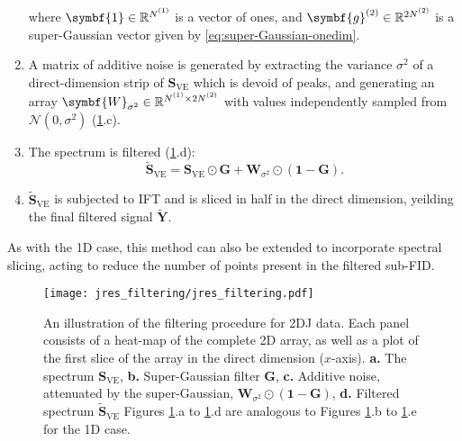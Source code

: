 \begin{enumerate}
        where $\symbf{1} \in \mathbb{R}^{\None}$ is a vector of ones, and
        $\symbf{g}^{(2)} \in \mathbb{R}^{2\Ntwo}$ is a super-Gaussian vector
        given by \cref{eq:super-Gaussian-onedim}.
    \item A matrix of additive noise is generated by extracting the variance
        $\sigma^2$ of a direct-dimension strip of $\symbf{S}_{\text{VE}}$ which
        is devoid of peaks, and generating an array $\symbf{W}_{\sigma^2} \in
        \mathbb{R}^{\None \times 2 \Ntwo}$ with values independently sampled
        from $\mathcal{N}(0, \sigma^2)$ (\cref{fig:jres-filtering}.c).
    \item The spectrum is filtered (\cref{fig:jres-filtering}.d):
        \begin{equation}
            \widetilde{\symbf{S}}_{\text{VE}} = \symbf{S}_{\text{VE}} \odot
            \symbf{G} + \symbf{W}_{\sigma^2} \odot (\symbf{1} - \symbf{G}).
        \end{equation}
    \item $\widetilde{\symbf{S}}_{\text{VE}}$ is subjected to \ac{IFT} and is
        sliced in half in the direct dimension, yeilding the final filtered
        signal $\widetilde{\symbf{Y}}$.
\end{enumerate}
As with the \ac{1D} case, this method can also be extended to
incorporate spectral slicing, acting to reduce the number of points present in
the filtered sub-\ac{FID}.

\begin{figure}
    \centering
    \texttt{[image: jres\_filtering/jres\_filtering.pdf]}
    \caption[
        An illustration of the filtering procedure for \acs{2DJ} data.
    ]
    {
        An illustration of the filtering procedure for \ac{2DJ} data.
        Each panel consists of a heat-map of the complete \ac{2D} array, as well as
        a plot of the first slice of the array in the direct dimension ($x$-axis).
        \textbf{a.} The spectrum $\symbf{S}_{\text{VE}}$,
        \textbf{b.} Super-Gaussian filter $\symbf{G}$,
        \textbf{c.} Additive noise, attenuated by the super-Gaussian, $\symbf{W}_{\sigma^2} \odot (\symbf{1} - \symbf{G})$,
        \textbf{d.} Filtered spectrum $\widetilde{\symbf{S}}_{\text{VE}}$
        Figures \ref{fig:jres-filtering}.a to \ref{fig:jres-filtering}.d
        are analogous to
        Figures \ref{fig:jres-filtering}.b to \ref{fig:jres-filtering}.e
        for the \ac{1D} case.
    }
    \label{fig:jres-filtering}
\end{figure}


